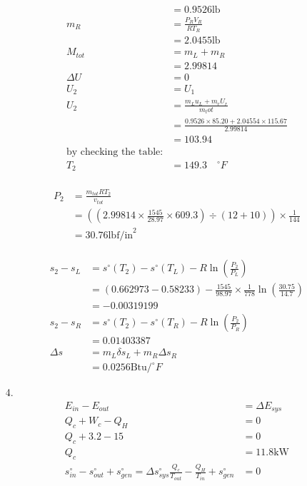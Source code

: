 \documentclass{article}
\begin{document}
\begin{itemize}
\begin{align*}
        &=0.9526 \text{lb}\\
        m_R &=\frac{P_RV_R}{RT_R}\\
        &=2.0455 \text{lb}\\
        M_{tot}&=m_L+m_R\\
        &=2.99814\\
        \Delta U &=0\\
        U_2&=U_1\\
        U_2 &= \frac{m_Lu_L+m_rU_r}{m_tot}\\
        &=\frac{0.9526\times 85.20+2.04554\times 115.67}{2.99814}\\
        &=103.94\\
        \text{by checking the table:}\\
        T_2&=149.3 \quad ^{\circ}F
    \end{align*}
    \\
    \begin{align*}
        P_2&= \frac{m_{tot}RT_2}{v_{tot}}\\
        &=\left((2.99814\times \frac{1545}{28.97}\times 609.3)\div(12+10)\right)\times \frac{1}{144}\\
        &=30.76 \text{lbf/in}^2
    \end{align*}
    \\
    \begin{align*}
        s_2-s_L&=s^\circ(T_2)-s^\circ(T_L)-R\ln(\frac{P_2}{P_L})\\
        &=(0.662973-0.58233)-\frac{1545}{98.97}\times \frac{1}{778}\ln(\frac{30.75}{14.7})\\
        &=-0.00319199\\
        s_2-s_R&=s^\circ(T_2)-s^\circ(T_R)-R\ln(\frac{P_2}{P_R})\\
        &=0.01403387\\
        \Delta s &= m_L\delta s_L+m_R\Delta s_R\\
        &=0.0256 \text{Btu/}^\circ F
    \end{align*}
    \item [4.]
    \begin{align*}
        E_{in}-E_{out}&=\Delta E_{sys}\\
        Q_c+W_c-Q_H&=0\\
        Q_c+3.2-15&=0\\
        Q_c &=11.8 \text{kW}\\
        s^{\circ}_{in}-s^{\circ}_{out}+s^{\circ}_{gen}=\Delta s^{\circ}_{sys}
        \frac{Q_c}{T_{out}}-\frac{Q_H}{T_{in}}+s^{\circ}_{gen}&=0\\

\end{align*}
\end{itemize}
\end{document}
